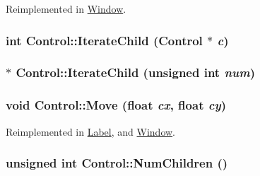 Reimplemented in \hyperlink{class_window_9104959ec00d2c1dc16eb20303a6f7b7}{Window}.\hypertarget{class_control_4f0b3da2c0add2bb739ad1c077d88ba8}{
\subsubsection[{IterateChild}]{\setlength{\rightskip}{0pt plus 5cm}int Control::IterateChild ({\bf Control} $\ast$ {\em c})}}
\label{class_control_4f0b3da2c0add2bb739ad1c077d88ba8}


\hypertarget{class_control_b719c1843ea119e5c137a6a668df8179}{
\subsubsection[{IterateChild}]{ $\ast$ Control::IterateChild (unsigned int {\em num})}}
\label{class_control_b719c1843ea119e5c137a6a668df8179}


\hypertarget{class_control_8ba2e26364554895c0581a6d3e569649}{
\subsubsection[{Move}]{\setlength{\rightskip}{0pt plus 5cm}void Control::Move (float {\em cx}, \/  float {\em cy})}}
\label{class_control_8ba2e26364554895c0581a6d3e569649}




Reimplemented in \hyperlink{class_label_7be1625ce797ee05dcf6c7553ba0705f}{Label}, and \hyperlink{class_window_88ad9940f1705d2f635bdefc70384d17}{Window}.\hypertarget{class_control_40b01c0e65c2fec12afb950d3758983f}{
\subsubsection[{NumChildren}]{\setlength{\rightskip}{0pt plus 5cm}unsigned int Control::NumChildren ()}}
\label{class_control_40b01c0e65c2fec12afb950d3758983f}




